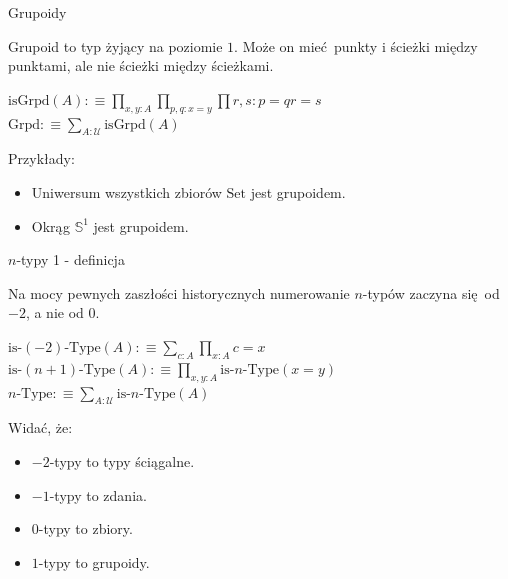 \documentclass{beamer}
\newcommand{\defn}{:\equiv}
\newcommand{\U}{\mathcal{U}}
\newcommand{\isGrpd}{\text{isGrpd}}
\newcommand{\Set}{\text{Set}}
\newcommand{\Grpd}{\text{Grpd}}
\begin{document}
\begin{frame}{Grupoidy}

Grupoid to typ żyjący na poziomie $1$. Może on mieć punkty i ścieżki między punktami, ale nie ścieżki między ścieżkami.

\begin{definition}
$\isGrpd(A) \defn \prod_{x, y : A} \prod_{p, q : x = y} \prod{r, s : p = q} r = s$ \\
$\Grpd \defn \sum_{A : \U} \isGrpd(A)$
\end{definition}

Przykłady:
\begin{itemize}
	\item Uniwersum wszystkich zbiorów $\Set$ jest grupoidem.
	\item Okrąg $\mathbb{S}^1$ jest grupoidem.
\end{itemize}

\end{frame}

\begin{frame}{$n$-typy 1 - definicja}

Na mocy pewnych zaszłości historycznych numerowanie $n$-typów zaczyna się od $-2$, a nie od $0$.

\begin{definition}[$n$-typ]
$\text{is-}(-2)\text{-Type}(A) \defn \sum_{c : A} \prod_{x : A} c = x$ \\
$\text{is-}(n + 1)\text{-Type}(A) \defn \prod_{x, y : A} \text{is-}n\text{-Type}(x = y)$ \\
$n\text{-Type} \defn \sum_{A : \U} \text{is-}n\text{-Type}(A)$
\end{definition}

Widać, że:
\begin{itemize}
	\item $-2$-typy to typy ściągalne.
	\item $-1$-typy to zdania.
	\item $0$-typy to zbiory.
	\item $1$-typy to grupoidy.
\end{itemize}

\end{frame}
\end{document}
